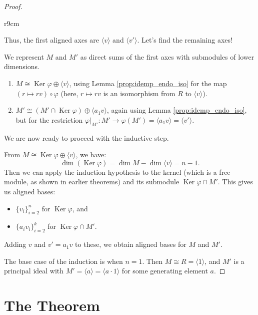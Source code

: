 \documentclass{article}
\newif\ifusemulticols
\newif\ifmobileview
\theoremstyle{definition}
\theoremstyle{remark}
\theoremstyle{plain}
\theoremstyle{plain}
\newenvironment{mymulticols}
    { \ifusemulticols \begin{multicols}{2} \fi }
    { \ifusemulticols \end{multicols} \fi }
\newcommand\mywrapbegin[3]{\ifmobileview\else\begin{wrapfigure}[#1]{#2}{#3}\fi}
\newcommand\mywrapend{\ifmobileview\else\end{wrapfigure}\fi}
\DeclareMathOperator{\Ker}{Ker}
\begin{document}
\begin{mymulticols}
\begin{proof}
    \mywrapbegin{21}{r}{9cm}
    \mywrapend

    Thus, the first aligned axes are $\langle v \rangle$ and $\langle v' \rangle$.
    Let's find the remaining axes!

    We represent $M$ and $M'$ as direct sums of the first axes with submodules of lower dimensions.

    \begin{enumerate}
        \item $M \cong \Ker \varphi \oplus \langle v \rangle$, using Lemma \ref{prop:idemp_endo_iso}
            for the map $(r \mapsto rv) \circ \varphi$ (here, $r \mapsto rv$ is an isomorphism from
            $R$ to $\langle v \rangle$).

        \item $M' \cong (M' \cap \Ker \varphi) \oplus \langle a_1 v \rangle$, again using Lemma
            \ref{prop:idemp_endo_iso}, but for the restriction $\varphi|_{M'} : M' \to \varphi(M') =
            \langle a_1 v \rangle = \langle v' \rangle$.
    \end{enumerate}

    We are now ready to proceed with the inductive step.

    From $M \cong \Ker \varphi \oplus \langle v \rangle$, we have:
    $$\dim(\Ker \varphi) = \dim M - \dim \langle v \rangle = n - 1.$$
    Then we can apply the induction hypothesis to the kernel (which is a free module, as shown in earlier theorems) and its submodule $\Ker \varphi \cap M'$. This gives us aligned bases:
    \begin{itemize}
        \item $\{v_i\}_{i=2}^n$ for $\Ker \varphi$, and
        \item $\{a_i v_i\}_{i=2}^k$ for $\Ker \varphi \cap M'$.
    \end{itemize}

    Adding $v$ and $v' = a_1 v$ to these, we obtain aligned bases for $M$ and $M'$.

    The base case of the induction is when $n = 1$. Then $M \cong R = \langle 1 \rangle$, and $M'$
    is a principal ideal with $M' = \langle a \rangle = \langle a \cdot 1 \rangle$ for some generating element $a$.
\end{proof}

\section{The Theorem}%
\label{sec:the_theorem}


\end{mymulticols}
\end{document}
